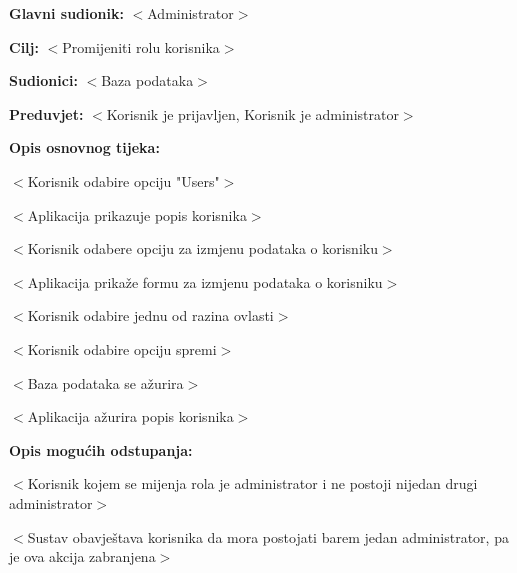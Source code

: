 					\noindent {}
					\begin{packed_item}

						\item \textbf{Glavni sudionik:} $<$Administrator$>$
						\item \textbf{Cilj:} $<$Promijeniti rolu korisnika$>$
						\item \textbf{Sudionici:} $<$Baza podataka$>$
						\item \textbf{Preduvjet:} $<$Korisnik je prijavljen, Korisnik je administrator$>$
						\item \textbf{Opis osnovnog tijeka:}

						\item[] \begin{packed_enum}

							\item $<$Korisnik odabire opciju "Users"$>$
							\item $<$Aplikacija prikazuje popis korisnika$>$
							\item $<$Korisnik odabere opciju za izmjenu podataka o korisniku$>$
							\item $<$Aplikacija prikaže formu za izmjenu podataka o korisniku$>$
							\item $<$Korisnik odabire jednu od razina ovlasti$>$
							\item $<$Korisnik odabire opciju spremi$>$
							\item $<$Baza podataka se ažurira$>$
							\item $<$Aplikacija ažurira popis korisnika$>$

						\end{packed_enum}

						\item \textbf{Opis mogućih odstupanja:}

						\item[] \begin{packed_item}

							\item[3.a] $<$Korisnik kojem se mijenja rola je administrator i ne postoji nijedan
							drugi administrator$>$
							\item[] \begin{packed_enum}

								\item $<$Sustav obavještava korisnika da mora postojati
								barem jedan administrator, pa je ova akcija zabranjena$>$

							\end{packed_enum}

						\end{packed_item}
					\end{packed_item}

